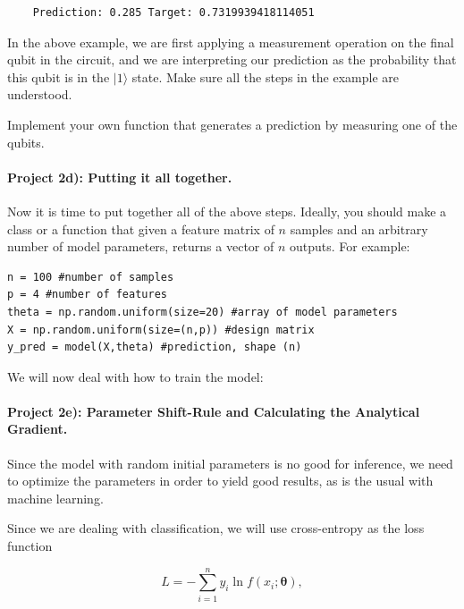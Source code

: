\documentclass[%
oneside,                 %
final,                   %
10pt]{article}
\begin{document}
\begin{verbatim}
    Prediction: 0.285 Target: 0.7319939418114051

\end{verbatim}


In the above example, we are first applying a measurement operation on
the final qubit in the circuit, and we are interpreting our prediction
as the probability that this qubit is in the $\vert 1\rangle$ state. Make
sure all the steps in the example are understood.

Implement your own function that generates a prediction by measuring one of the qubits.

\paragraph{Project 2d): Putting it all together.}
Now it is time to put together all of the above steps. Ideally, you
should make a class or a function that given a feature matrix of $n$
samples and an arbitrary number of model parameters, returns a vector
of $n$ outputs. For example:







\begin{verbatim}
n = 100 #number of samples
p = 4 #number of features
theta = np.random.uniform(size=20) #array of model parameters
X = np.random.uniform(size=(n,p)) #design matrix
y_pred = model(X,theta) #prediction, shape (n)

\end{verbatim}


We will now deal with how to train the model:

\paragraph{Project 2e): Parameter Shift-Rule and Calculating the Analytical Gradient.}
Since the model with random initial parameters is no good for
inference, we need to optimize the parameters in order to yield good
results, as is the usual with machine learning.

Since we are dealing with classification, we will use cross-entropy as the loss function

\begin{equation*}
    L = -\sum_{i=1}^{n}{y_i \ln{f(x_i;\boldsymbol{\theta})}},
\end{equation*}
\end{document}
